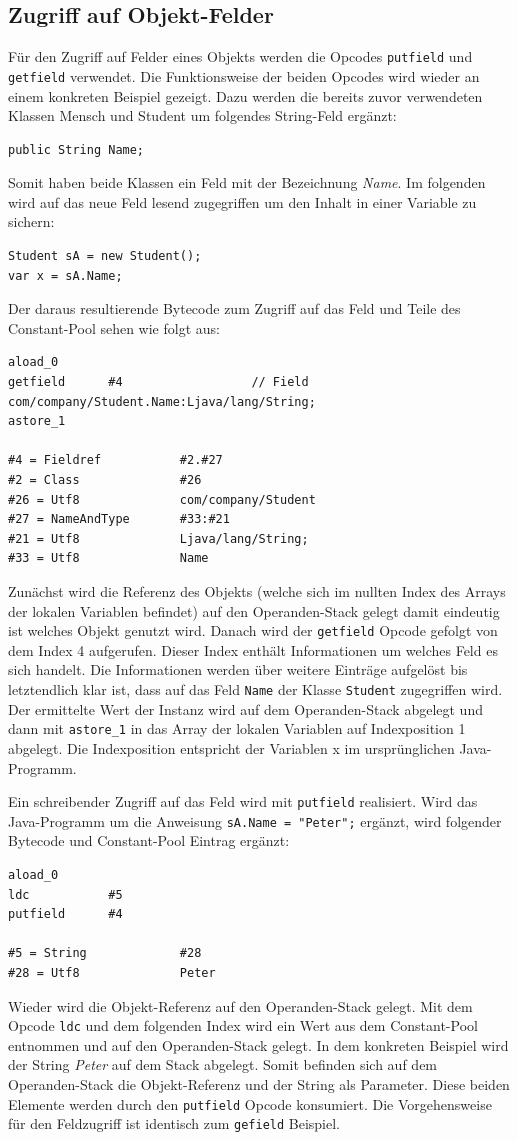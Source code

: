 \documentclass[conference]{IEEEtran}
\begin{document}
\subsection{Zugriff auf Objekt-Felder}
Für den Zugriff auf Felder eines Objekts werden die Opcodes \verb|putfield| und \verb|getfield| verwendet. Die Funktionsweise der beiden Opcodes wird wieder an einem konkreten Beispiel gezeigt. Dazu werden die bereits zuvor verwendeten Klassen Mensch und Student um folgendes String-Feld ergänzt:
\begin{lstlisting}
public String Name;
\end{lstlisting}
Somit haben beide Klassen ein Feld mit der Bezeichnung \textit{Name}. Im folgenden wird auf das neue Feld lesend zugegriffen um den Inhalt in einer Variable zu sichern:
\begin{lstlisting}
Student sA = new Student();
var x = sA.Name;
\end{lstlisting}
Der daraus resultierende Bytecode zum Zugriff auf das Feld und Teile des Constant-Pool sehen wie folgt aus:
\begin{lstlisting}
aload_0
getfield      #4                  // Field com/company/Student.Name:Ljava/lang/String;
astore_1

#4 = Fieldref           #2.#27         
#2 = Class              #26   
#26 = Utf8              com/company/Student         
#27 = NameAndType       #33:#21        
#21 = Utf8              Ljava/lang/String;
#33 = Utf8              Name
\end{lstlisting}
Zunächst wird die Referenz des Objekts (welche sich im nullten Index des Arrays der lokalen Variablen befindet) auf den Operanden-Stack gelegt damit eindeutig ist welches Objekt genutzt wird. Danach wird der \verb|getfield| Opcode gefolgt von dem Index 4 aufgerufen. Dieser Index enthält Informationen um welches Feld es sich handelt. Die Informationen werden über weitere Einträge aufgelöst bis letztendlich klar ist, dass auf das Feld \verb|Name| der Klasse \verb|Student| zugegriffen wird. Der ermittelte Wert der Instanz wird auf dem Operanden-Stack abgelegt und dann mit \verb|astore_1| in das Array der lokalen Variablen auf Indexposition 1 abgelegt. Die Indexposition entspricht der Variablen x im ursprünglichen Java-Programm.

Ein schreibender Zugriff auf das Feld wird mit \verb|putfield| realisiert. Wird das Java-Programm um die Anweisung \verb|sA.Name = "Peter";| ergänzt, wird folgender Bytecode und Constant-Pool Eintrag ergänzt:
\begin{lstlisting}
aload_0
ldc           #5
putfield      #4

#5 = String             #28
#28 = Utf8              Peter
\end{lstlisting}
Wieder wird die Objekt-Referenz auf den Operanden-Stack gelegt. Mit dem Opcode \verb|ldc| und dem folgenden Index wird ein Wert aus dem Constant-Pool entnommen und auf den Operanden-Stack gelegt. In dem konkreten Beispiel wird der String \textit{Peter} auf dem Stack abgelegt. Somit befinden sich auf dem Operanden-Stack die Objekt-Referenz und der String als Parameter. Diese beiden Elemente werden durch den \verb|putfield| Opcode konsumiert. Die Vorgehensweise für den Feldzugriff ist identisch zum \verb|gefield| Beispiel. 
\end{document}
